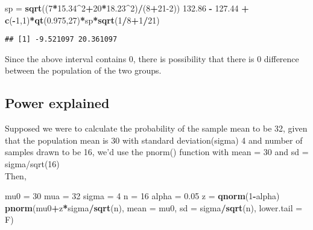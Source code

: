 \documentclass[
]{article}
\newenvironment{Shaded}{\begin{snugshade}}{\end{snugshade}}
\newcommand{\DataTypeTok}[1]{\textcolor[rgb]{0.13,0.29,0.53}{#1}}
\newcommand{\DecValTok}[1]{\textcolor[rgb]{0.00,0.00,0.81}{#1}}
\newcommand{\FloatTok}[1]{\textcolor[rgb]{0.00,0.00,0.81}{#1}}
\newcommand{\KeywordTok}[1]{\textcolor[rgb]{0.13,0.29,0.53}{\textbf{#1}}}
\newcommand{\NormalTok}[1]{#1}
\newcommand{\OperatorTok}[1]{\textcolor[rgb]{0.81,0.36,0.00}{\textbf{#1}}}
\newcommand{\StringTok}[1]{\textcolor[rgb]{0.31,0.60,0.02}{#1}}
\begin{document}
\begin{Shaded}
\begin{Highlighting}[]
\NormalTok{sp =}\StringTok{ }\KeywordTok{sqrt}\NormalTok{((}\DecValTok{7}\OperatorTok{*}\FloatTok{15.34}\OperatorTok{^}\DecValTok{2}\OperatorTok{+}\DecValTok{20}\OperatorTok{*}\FloatTok{18.23}\OperatorTok{^}\DecValTok{2}\NormalTok{)}\OperatorTok{/}\NormalTok{(}\DecValTok{8}\OperatorTok{+}\DecValTok{21-2}\NormalTok{))}
\FloatTok{132.86} \OperatorTok{-}\StringTok{ }\FloatTok{127.44} \OperatorTok{+}\StringTok{ }\KeywordTok{c}\NormalTok{(}\OperatorTok{-}\DecValTok{1}\NormalTok{,}\DecValTok{1}\NormalTok{)}\OperatorTok{*}\KeywordTok{qt}\NormalTok{(}\FloatTok{0.975}\NormalTok{,}\DecValTok{27}\NormalTok{)}\OperatorTok{*}\NormalTok{sp}\OperatorTok{*}\KeywordTok{sqrt}\NormalTok{(}\DecValTok{1}\OperatorTok{/}\DecValTok{8}\OperatorTok{+}\DecValTok{1}\OperatorTok{/}\DecValTok{21}\NormalTok{)}
\end{Highlighting}
\end{Shaded}

\begin{verbatim}
## [1] -9.521097 20.361097
\end{verbatim}

Since the above interval contains 0, there is possibility that there is
0 difference between the population of the two groups.

\hypertarget{power-explained}{%
\subsection{Power explained}\label{power-explained}}

Supposed we were to calculate the probability of the sample mean to be
32, given that the population mean is 30 with standard deviation(sigma)
4 and number of samples drawn to be 16, we'd use the pnorm() function
with mean = 30 and sd = sigma/sqrt(16)\\
Then,

\begin{Shaded}
\begin{Highlighting}[]
\NormalTok{mu0 =}\StringTok{ }\DecValTok{30}
\NormalTok{mua =}\StringTok{ }\DecValTok{32}
\NormalTok{sigma =}\StringTok{ }\DecValTok{4}
\NormalTok{n =}\StringTok{ }\DecValTok{16}
\NormalTok{alpha =}\StringTok{ }\FloatTok{0.05}
\NormalTok{z =}\StringTok{ }\KeywordTok{qnorm}\NormalTok{(}\DecValTok{1}\OperatorTok{-}\NormalTok{alpha)}
\KeywordTok{pnorm}\NormalTok{(mu0}\OperatorTok{+}\NormalTok{z}\OperatorTok{*}\NormalTok{sigma}\OperatorTok{/}\KeywordTok{sqrt}\NormalTok{(n), }\DataTypeTok{mean =}\NormalTok{ mu0, }\DataTypeTok{sd =}\NormalTok{ sigma}\OperatorTok{/}\KeywordTok{sqrt}\NormalTok{(n), }\DataTypeTok{lower.tail =}\NormalTok{ F)}
\end{Highlighting}
\end{Shaded}
\end{document}

